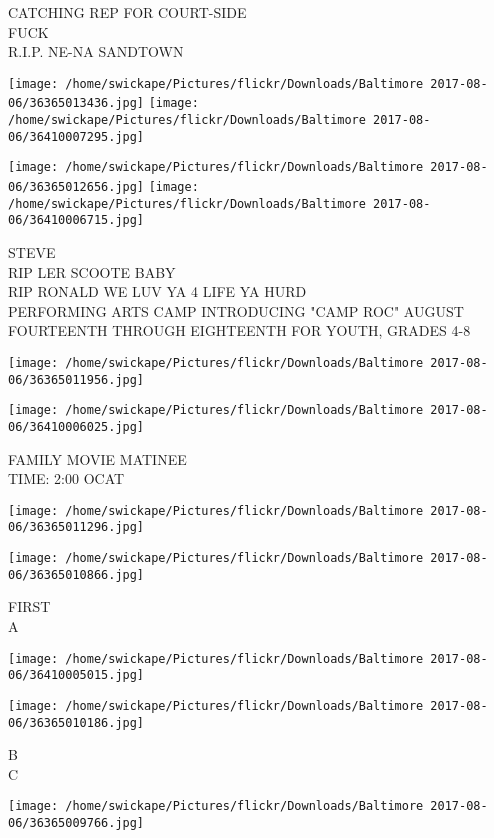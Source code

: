 \documentclass[10pt,letterpaper]{article}
\begin{document}
CATCHING REP FOR COURT{-}SIDE\\
FUCK\\
R.I.P. NE{-}NA SANDTOWN
\pagebreak

\texttt{[image: /home/swickape/Pictures/flickr/Downloads/Baltimore 2017-08-06/36365013436.jpg]}
\texttt{[image: /home/swickape/Pictures/flickr/Downloads/Baltimore 2017-08-06/36410007295.jpg]}

\texttt{[image: /home/swickape/Pictures/flickr/Downloads/Baltimore 2017-08-06/36365012656.jpg]}
\texttt{[image: /home/swickape/Pictures/flickr/Downloads/Baltimore 2017-08-06/36410006715.jpg]}

STEVE\\
RIP LER SCOOTE BABY\\
RIP RONALD WE LUV YA 4 LIFE YA HURD\\
PERFORMING ARTS CAMP INTRODUCING "CAMP ROC" AUGUST FOURTEENTH THROUGH EIGHTEENTH FOR YOUTH, GRADES 4{-}8
\pagebreak

\texttt{[image: /home/swickape/Pictures/flickr/Downloads/Baltimore 2017-08-06/36365011956.jpg]}

\vspace{0.25in}
\texttt{[image: /home/swickape/Pictures/flickr/Downloads/Baltimore 2017-08-06/36410006025.jpg]}

FAMILY MOVIE MATINEE\\
TIME: 2:00 OCAT
\pagebreak

\texttt{[image: /home/swickape/Pictures/flickr/Downloads/Baltimore 2017-08-06/36365011296.jpg]}

\vspace{0.25in}
\texttt{[image: /home/swickape/Pictures/flickr/Downloads/Baltimore 2017-08-06/36365010866.jpg]}

FIRST\\
A
\pagebreak

\texttt{[image: /home/swickape/Pictures/flickr/Downloads/Baltimore 2017-08-06/36410005015.jpg]}

\vspace{0.25in}
\texttt{[image: /home/swickape/Pictures/flickr/Downloads/Baltimore 2017-08-06/36365010186.jpg]}

B\\
C
\pagebreak

\texttt{[image: /home/swickape/Pictures/flickr/Downloads/Baltimore 2017-08-06/36365009766.jpg]}
\end{document}
